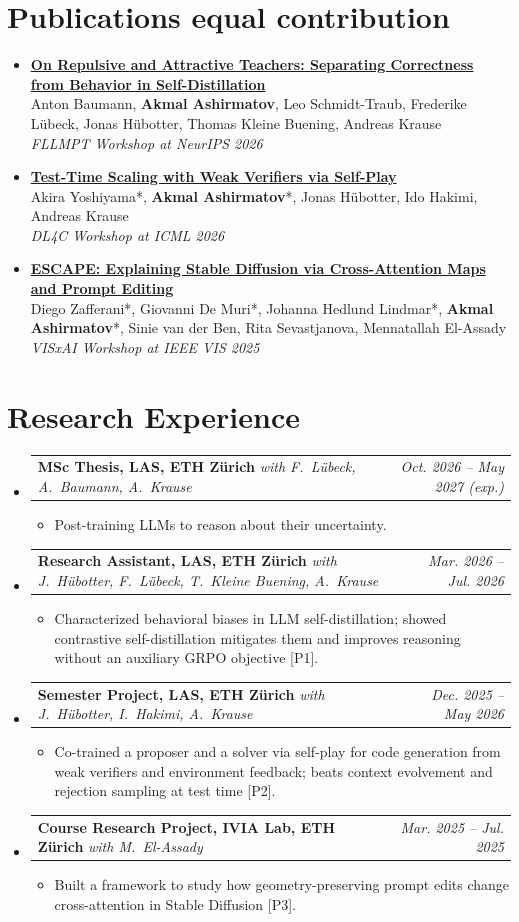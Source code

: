 \documentclass[10pt]{article}
\makeatletter
\newcommand{\resumeItem}[1]{\item #1}
\newcommand{\resumeSubheading}[3]{%
    \item\begin{tabularx}{\linewidth}[t]{@{}X@{\hspace{0.8em}}r@{}}%
    \textbf{#1} \textit{\small #2} & \textit{\small #3}\\
    \end{tabularx}\par}
\newcommand{\pub}[4]{%
    \item[{[#1]}] \textbf{#2}\\
    #3\\
    \textit{#4}}
\newcommand{\resumeSubHeadingListStart}{\begin{itemize}[leftmargin=1.2em,topsep=0pt,partopsep=0pt,itemsep=1pt,parsep=0pt]}
\newcommand{\resumeSubHeadingListEnd}{\end{itemize}}
\newcommand{\resumeItemListStart}{\begin{itemize}[leftmargin=1.2em,topsep=0pt,partopsep=0pt,itemsep=0pt,parsep=0pt]}
\newcommand{\resumeItemListEnd}{\end{itemize}}
\newcommand{\linked}[2]{%
    \href{#1}{#2\nobreak\hspace{0.15em}%
    \textcolor{MidnightBlue}{\raisebox{0.2ex}{\scriptsize$\nearrow$}}}}
\makeatother
\begin{document}
\section{Publications {\normalfont\small\hfill * equal contribution}}
\begin{itemize}[leftmargin=2.2em,labelsep=0.4em,topsep=0pt,partopsep=0pt,itemsep=2pt,parsep=0pt]
    \pub{P1}
        {\linked{https://self-distillation.github.io/repulsive_attractive.html}{On Repulsive and Attractive Teachers: Separating Correctness from Behavior in Self-Distillation}}
        {Anton Baumann, \textbf{Akmal Ashirmatov}, Leo Schmidt-Traub, Frederike L\"ubeck, Jonas H\"ubotter, Thomas Kleine Buening, Andreas Krause}
        {FLLMPT Workshop at NeurIPS 2026}
    \pub{P2}
        {\linked{https://openreview.net/forum?id=oYX0DXuv7a}{Test-Time Scaling with Weak Verifiers via Self-Play}}
        {Akira Yoshiyama*, \textbf{Akmal Ashirmatov}*, Jonas H\"ubotter, Ido Hakimi, Andreas Krause}
        {DL4C Workshop at ICML 2026}
    \pub{P3}
        {\linked{https://visxai.io/2025}{ESCAPE: Explaining Stable Diffusion via Cross-Attention Maps and Prompt Editing}}
        {Diego Zafferani*, Giovanni De Muri*, Johanna Hedlund Lindmar*, \textbf{Akmal Ashirmatov}*, Sinie van der Ben, Rita Sevastjanova, Mennatallah El-Assady}
        {VISxAI Workshop at IEEE VIS 2025}
\end{itemize}

\section{Research Experience}
\resumeSubHeadingListStart
    \resumeSubheading{MSc Thesis, LAS, ETH Z\"urich}{with F.\ L\"ubeck, A.\ Baumann, A.\ Krause}{Oct. 2026 -- May 2027 (exp.)}
        \resumeItemListStart
        \resumeItem{Post-training LLMs to reason about their uncertainty.}
        \resumeItemListEnd
    \resumeSubheading{Research Assistant, LAS, ETH Z\"urich}{with J.\ H\"ubotter, F.\ L\"ubeck, T.\ Kleine Buening, A.\ Krause}{Mar. 2026 -- Jul. 2026}
        \resumeItemListStart
        \resumeItem{Characterized behavioral biases in LLM self-distillation; showed contrastive self-distillation mitigates them and improves reasoning without an auxiliary GRPO objective [P1].}
        \resumeItemListEnd
    \resumeSubheading{Semester Project, LAS, ETH Z\"urich}{with J.\ H\"ubotter, I.\ Hakimi, A.\ Krause}{Dec. 2025 -- May 2026}
        \resumeItemListStart
        \resumeItem{Co-trained a proposer and a solver via self-play for code generation from weak verifiers and environment feedback; beats context evolvement and rejection sampling at test time [P2].}
        \resumeItemListEnd
    \resumeSubheading{Course Research Project, IVIA Lab, ETH Z\"urich}{with M.\ El-Assady}{Mar. 2025 -- Jul. 2025}
        \resumeItemListStart
        \resumeItem{Built a framework to study how geometry-preserving prompt edits change cross-attention in Stable Diffusion [P3].}
        \resumeItemListEnd
\resumeSubHeadingListEnd
\end{document}
